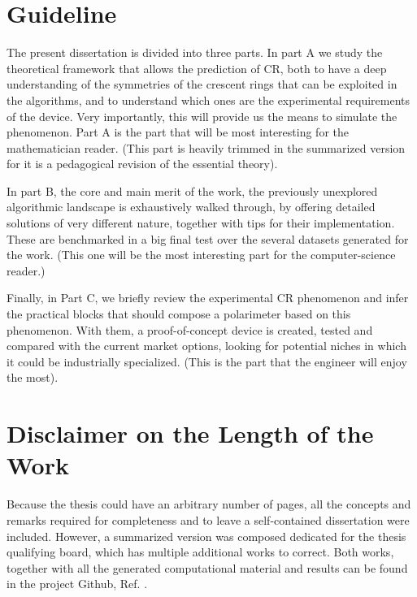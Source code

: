 \documentclass[11pt, a4paper, twoside]{article} %
\begin{document}

\section*{Guideline}\vspace{-0.1cm}
The present dissertation is divided into three parts. In part A we study the theoretical framework that allows the prediction of CR, both to have a deep understanding of the symmetries of the crescent rings that can be exploited in the algorithms, and to understand which ones are the experimental requirements of the device. Very importantly, this will provide us the means to simulate the phenomenon. Part A is the part that will be most interesting for the mathematician reader. (This part is heavily trimmed in the summarized version for it is a pedagogical revision of the essential theory).

 In part B, the core and main merit of the work, the previously unexplored algorithmic landscape is exhaustively walked through, by offering detailed solutions of very different nature, together with tips for their implementation. These are benchmarked in a big final test over the several datasets generated for the work. (This one will be the most interesting part for the computer-science reader.)

Finally, in Part C, we briefly review the experimental CR phenomenon and infer the practical blocks that should compose a polarimeter based on this phenomenon. With them, a proof-of-concept device is created, tested and compared with the current market options, looking for potential niches in which it could be industrially specialized. (This is the part that the engineer will enjoy the most).

\section*{Disclaimer on the Length of the Work\vspace{-0.1cm}}


Because the thesis could have an arbitrary number of pages, all the concepts and remarks required for completeness and to leave a self-contained dissertation were included. However, a summarized version was composed dedicated for the thesis qualifying board, which has multiple additional works to correct. Both works, together with all the generated computational material and results can be found in the project Github, Ref. \cite{github}.
\end{document}

